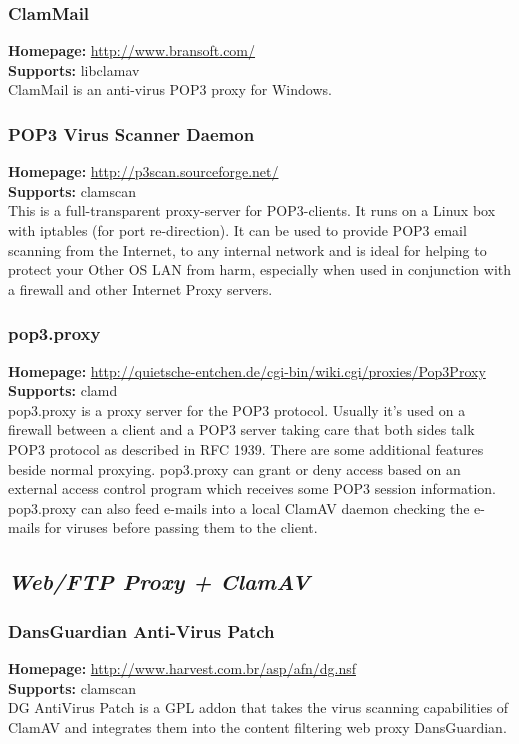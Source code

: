 \documentclass[a4paper,titlepage,12pt]{article}
\begin{document}
    \subsubsection{ClamMail}
    \textbf{Homepage:} \url{http://www.bransoft.com/}\\
    \textbf{Supports:} libclamav\\[4pt]
    ClamMail is an anti-virus POP3 proxy for Windows.

    \subsubsection{POP3 Virus Scanner Daemon}
    \textbf{Homepage:} \url{http://p3scan.sourceforge.net/}\\
    \textbf{Supports:} clamscan\\[4pt]
    This is a full-transparent proxy-server for POP3-clients. It runs on
    a Linux box with iptables (for port re-direction). It can be used to
    provide POP3 email scanning from the Internet, to any internal network
    and is ideal for helping to protect your Other OS LAN from harm,
    especially when used in conjunction with a firewall and other Internet
    Proxy servers.

    \subsubsection{pop3.proxy}
    \textbf{Homepage:} \url{http://quietsche-entchen.de/cgi-bin/wiki.cgi/proxies/Pop3Proxy}\\
    \textbf{Supports:} clamd\\[4pt]
     pop3.proxy is a proxy server for the POP3 protocol. Usually it's used on
     a firewall between a client and a POP3 server taking care that both sides
     talk POP3 protocol as described in RFC 1939. There are some additional
     features beside normal proxying. pop3.proxy can grant or deny access
     based on an external access control program which receives some POP3
     session information. pop3.proxy can also feed e-mails into a local
     ClamAV daemon checking the e-mails for viruses before passing them to
     the client. 

    \subsection{\emph{Web/FTP Proxy + ClamAV}}

    \subsubsection{DansGuardian Anti-Virus Patch}
    \textbf{Homepage:} \url{http://www.harvest.com.br/asp/afn/dg.nsf}\\
    \textbf{Supports:} clamscan\\[4pt]
    DG AntiVirus Patch is a GPL addon that takes the virus scanning
    capabilities of ClamAV and integrates them into the content filtering
    web proxy DansGuardian.
\end{document}
